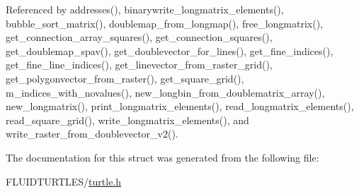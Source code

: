 Referenced by addresses(), binarywrite\-\_\-longmatrix\-\_\-elements(), bubble\-\_\-sort\-\_\-matrix(), doublemap\-\_\-from\-\_\-longmap(), free\-\_\-longmatrix(), get\-\_\-connection\-\_\-array\-\_\-squares(), get\-\_\-connection\-\_\-squares(), get\-\_\-doublemap\-\_\-spav(), get\-\_\-doublevector\-\_\-for\-\_\-lines(), get\-\_\-fine\-\_\-indices(), get\-\_\-fine\-\_\-line\-\_\-indices(), get\-\_\-linevector\-\_\-from\-\_\-raster\-\_\-grid(), get\-\_\-polygonvector\-\_\-from\-\_\-raster(), get\-\_\-square\-\_\-grid(), m\-\_\-indices\-\_\-with\-\_\-novalues(), new\-\_\-longbin\-\_\-from\-\_\-doublematrix\-\_\-array(), new\-\_\-longmatrix(), print\-\_\-longmatrix\-\_\-elements(), read\-\_\-longmatrix\-\_\-elements(), read\-\_\-square\-\_\-grid(), write\-\_\-longmatrix\-\_\-elements(), and write\-\_\-raster\-\_\-from\-\_\-doublevector\-\_\-v2().



The documentation for this struct was generated from the following file\-:\begin{DoxyCompactItemize}
\item 
F\-L\-U\-I\-D\-T\-U\-R\-T\-L\-E\-S/\hyperlink{turtle_8h}{turtle.\-h}\end{DoxyCompactItemize}
